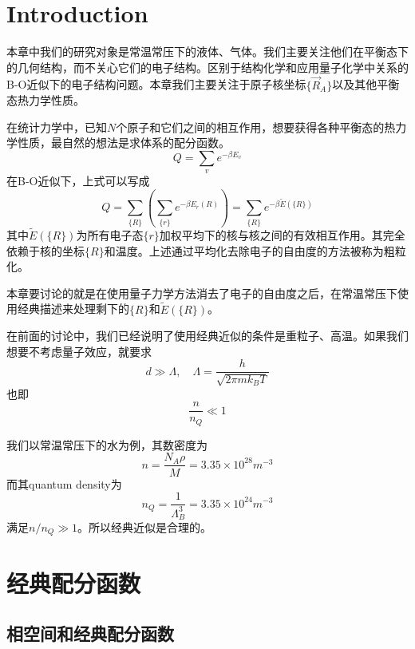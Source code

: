 \documentclass[AutoFakeBold]{tstextbook}
\begin{document}
\section{Introduction} %
\label{sec:Introduction 14}
本章中我们的研究对象是常温常压下的液体、气体。我们主要关注他们在平衡态下的几何结构，而不关心它们的电子结构。区别于结构化学和应用量子化学中关系的B-O近似下的电子结构问题。本章我们主要关注于原子核坐标$\{\vec{R}_A\}$以及其他平衡态热力学性质。

在统计力学中，已知$N$个原子和它们之间的相互作用，想要获得各种平衡态的热力学性质，最自然的想法是求体系的配分函数。
\begin{equation}
    Q=\sum_{v}e^{-\beta E_v}
\end{equation}
在B-O近似下，上式可以写成\begin{equation}
    Q=\sum_{\{R\}} \left(\sum_{\{r\}}e^{-\beta E_{r}(R)}\right) =\sum_{\{R\}} e^{-\beta {\widetilde{E}({\{R\}})}}
\end{equation}
其中$\widetilde{E}(\{R\})$为所有电子态$\{r\}$加权平均下的核与核之间的有效相互作用。其完全依赖于核的坐标$\{R\}$和温度。上述通过平均化去除电子的自由度的方法被称为粗粒化。

本章要讨论的就是在使用量子力学方法消去了电子的自由度之后，在常温常压下使用经典描述来处理剩下的$\{R\}$和$\widetilde{E}(\{R\})$。

在前面的讨论中，我们已经说明了使用经典近似的条件是重粒子、高温。如果我们想要不考虑量子效应，就要求\begin{equation}
    d \gg \Lambda,\quad \Lambda= \frac{h}{\sqrt{2\pi mk_B T}}
\end{equation}
也即\begin{equation}
    \frac{n}{n_Q} \ll 1
\end{equation}

我们以常温常压下的水为例，其数密度为\begin{equation}
    n= \frac{N_A \rho}{M} =3.35\times 10^{28} m^{-3}
\end{equation}
而其quantum density为\begin{equation}
    n_Q=\frac{1}{\Lambda_B^3} =3.35\times 10^{24} m^{-3}
\end{equation}
满足$n/n_Q \gg 1$。所以经典近似是合理的。
\section{经典配分函数} %
\label{sec:经典配分函数}
\subsection{相空间和经典配分函数} %
\label{sub:相空间和经典配分函数}
\end{document}
